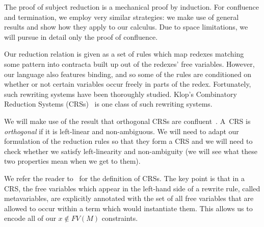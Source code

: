\documentclass{llncs}
\begin{document}
The proof of subject reduction is a mechanical proof by induction. For
confluence and termination, we employ very similar strategies: we make use
of general results and show how they apply to our calculus. Due to space
limitations, we will pursue in detail only the proof of confluence.

Our reduction relation is given as a set of rules which map redexes
matching some pattern into contracta built up out of the redexes' free
variables. However, our language also features binding, and so some of the
rules are conditioned on whether or not certain variables occur freely in
parts of the redex. Fortunately, such rewriting systems have been
thoroughly studied. Klop's Combinatory Reduction Systems
(CRSs)~\cite{klop1993combinatory} is one class of such rewriting systems.

We will make use of the result that orthogonal CRSs are
confluent~\cite{klop1993combinatory}. A~CRS is \emph{orthogonal} if it is
left-linear and non-ambiguous. We will need to adapt our formulation of the
reduction rules so that they form a CRS and we will need to check whether
we satisfy left-linearity and non-ambiguity (we will see what these two
properties mean when we get to them).

We refer the reader to~\cite{klop1993combinatory} for the definition of
CRSs. The key point is that in a CRS, the free variables which appear in
the left-hand side of a rewrite rule, called metavariables, are explicitly
annotated with the set of all free variables that are allowed to occur
within a term which would instantiate them. This allows us to encode all of
our $x \notin FV(M)$ constraints.
\end{document}
